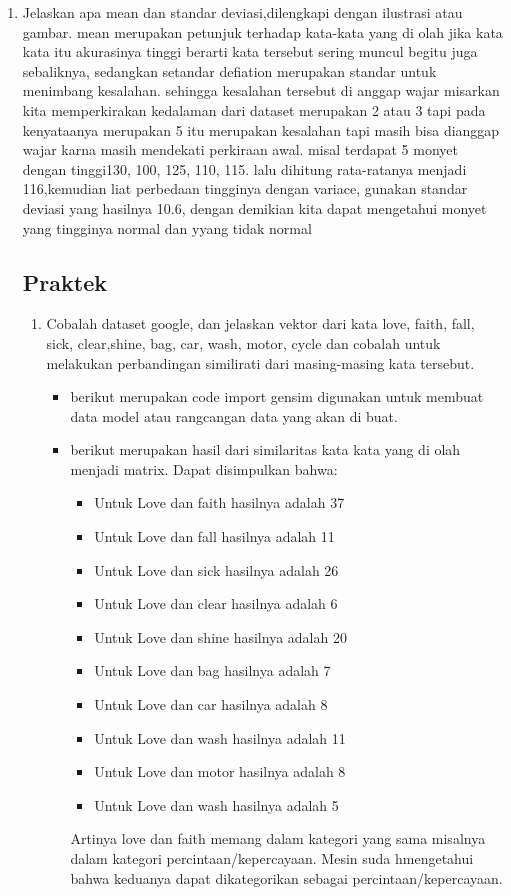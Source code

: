 \begin{enumerate}
	\item Jelaskan apa mean dan standar deviasi,dilengkapi dengan ilustrasi atau gambar.
	\hfill\break
	mean merupakan petunjuk terhadap kata-kata yang di olah jika kata kata itu akurasinya tinggi berarti kata tersebut sering muncul begitu juga sebaliknya, sedangkan setandar defiation merupakan standar untuk menimbang kesalahan. sehingga kesalahan tersebut di anggap wajar misarkan kita memperkirakan kedalaman dari dataset merupakan 2 atau 3 tapi pada kenyataanya merupakan 5 itu merupakan kesalahan tapi masih bisa dianggap wajar karna masih mendekati perkiraan awal.
	misal terdapat 5 monyet dengan tinggi130, 100, 125, 110, 115. lalu dihitung rata-ratanya menjadi 116,kemudian liat perbedaan tingginya dengan variace, gunakan standar deviasi yang hasilnya 10.6, dengan demikian kita dapat mengetahui monyet yang tingginya normal dan yyang tidak normal

	
\subsection{Praktek}
\begin{enumerate}
	\item Cobalah dataset google, dan jelaskan vektor dari kata love, faith, fall, sick, clear,shine, bag, car, wash, motor, cycle dan cobalah untuk melakukan perbandingan similirati dari masing-masing kata tersebut.
	\begin{itemize}
		\item berikut merupakan code import gensim digunakan untuk membuat data model atau rangcangan data yang akan di buat. 
		\hfill\break
		
		
		
		\item berikut merupakan hasil dari similaritas kata kata yang di olah menjadi matrix.
		Dapat disimpulkan bahwa:
		\begin{itemize}
		\item Untuk Love dan faith hasilnya adalah 37 
		\item Untuk Love dan fall hasilnya adalah 11
		\item Untuk Love dan sick hasilnya adalah 26
		\item Untuk Love dan clear hasilnya adalah 6
		\item Untuk Love dan shine hasilnya adalah 20
		\item Untuk Love dan bag hasilnya adalah 7
		\item Untuk Love dan car hasilnya adalah 8
		\item Untuk Love dan wash hasilnya adalah 11
		\item Untuk Love dan motor hasilnya adalah 8
		\item Untuk Love dan wash hasilnya adalah 5
		\end{itemize}
		Artinya love dan faith memang dalam kategori yang sama misalnya dalam kategori percintaan/kepercayaan. Mesin suda hmengetahui bahwa keduanya dapat dikategorikan sebagai percintaan/kepercayaan.


\end{itemize}
\end{enumerate}
\end{enumerate}

